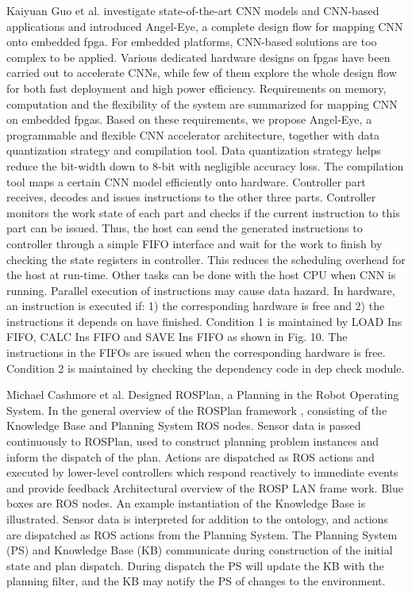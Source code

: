 Kaiyuan Guo et al. investigate state-of-the-art CNN models and CNN-based applications and introduced Angel-Eye\cite{GuoKaiyuan2018}, a complete design flow for mapping CNN onto embedded \gls{fpga}. For embedded platforms, CNN-based solutions are too complex to be applied. Various dedicated hardware designs on \gls{fpga}s have been carried out to accelerate CNNs, while few of them explore the whole design flow for both fast deployment and high power efficiency.  Requirements on memory, computation and the flexibility of the system are summarized for mapping CNN on embedded \gls{fpga}s. Based on these requirements, we propose Angel-Eye, a programmable and flexible CNN accelerator architecture, together with data quantization strategy and compilation tool. Data quantization strategy helps reduce the bit-width down to 8-bit with negligible accuracy loss. The compilation tool maps a certain CNN model efficiently onto hardware. Controller part receives, decodes and issues instructions to the other three parts. Controller monitors the work state of each part and checks if the current instruction to this part can be issued. Thus, the host can send the generated instructions to controller through a simple FIFO interface and wait for the work to finish by checking the state registers in controller. This reduces the scheduling overhead for the host at run-time. Other tasks can be done with the host CPU when CNN is running. Parallel execution of instructions may cause data hazard. In hardware, an instruction is executed if: 1) the corresponding hardware is free and 2) the instructions it depends on have finished. Condition 1 is maintained by LOAD Ins FIFO, CALC Ins FIFO and SAVE Ins FIFO as shown in Fig. 10. The instructions in the FIFOs are issued when the corresponding hardware is free. Condition 2 is maintained by checking the dependency code in dep check module.


Michael Cashmore et al. Designed ROSPlan, a Planning in the Robot Operating System\cite{Cashmore2015}. In the general overview of the ROSPlan framework , consisting of the Knowledge Base and Planning System ROS nodes. Sensor data is passed continuously to ROSPlan, used to construct planning problem instances and inform the dispatch of the plan. Actions are dispatched as ROS actions and executed by lower-level controllers which respond reactively to immediate events and provide feedback Architectural overview of the ROSP LAN frame work. Blue boxes are ROS nodes. An example instantiation of the Knowledge Base is illustrated. Sensor data is interpreted for addition to the ontology, and actions are dispatched as ROS actions from the Planning System. The Planning System (PS) and Knowledge Base (KB) communicate during construction of the initial state and plan dispatch. During dispatch the PS will update the KB with the planning filter, and the KB may notify the PS of changes to the environment.

